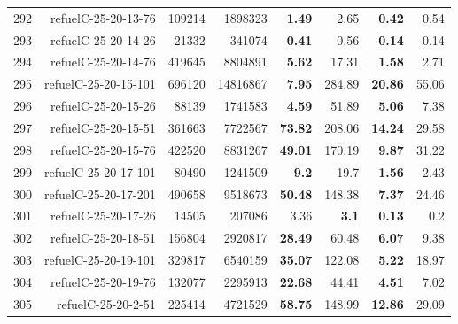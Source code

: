 \begin{longtable}{lrr@{\hskip 12pt}r@{\hskip 12pt}r@{\hskip 12pt}r@{\hskip 12pt}r@{\hskip 12pt}r}
292 & \multirow{1}{*}{refuelC-25-20-13-76} & \multirow{1}{*}{109214} & \multirow{1}{*}{1898323} & \textbf{1.49} & 2.65 & \textbf{0.42} & 0.54 \\
293 & \multirow{1}{*}{refuelC-25-20-14-26} & \multirow{1}{*}{21332} & \multirow{1}{*}{341074} & \textbf{0.41} & 0.56 & \textbf{0.14} & 0.14 \\
294 & \multirow{1}{*}{refuelC-25-20-14-76} & \multirow{1}{*}{419645} & \multirow{1}{*}{8804891} & \textbf{5.62} & 17.31 & \textbf{1.58} & 2.71 \\
295 & \multirow{1}{*}{refuelC-25-20-15-101} & \multirow{1}{*}{696120} & \multirow{1}{*}{14816867} & \textbf{7.95} & 284.89 & \textbf{20.86} & 55.06 \\
296 & \multirow{1}{*}{refuelC-25-20-15-26} & \multirow{1}{*}{88139} & \multirow{1}{*}{1741583} & \textbf{4.59} & 51.89 & \textbf{5.06} & 7.38 \\
297 & \multirow{1}{*}{refuelC-25-20-15-51} & \multirow{1}{*}{361663} & \multirow{1}{*}{7722567} & \textbf{73.82} & 208.06 & \textbf{14.24} & 29.58 \\
298 & \multirow{1}{*}{refuelC-25-20-15-76} & \multirow{1}{*}{422520} & \multirow{1}{*}{8831267} & \textbf{49.01} & 170.19 & \textbf{9.87} & 31.22 \\
299 & \multirow{1}{*}{refuelC-25-20-17-101} & \multirow{1}{*}{80490} & \multirow{1}{*}{1241509} & \textbf{9.2} & 19.7 & \textbf{1.56} & 2.43 \\
300 & \multirow{1}{*}{refuelC-25-20-17-201} & \multirow{1}{*}{490658} & \multirow{1}{*}{9518673} & \textbf{50.48} & 148.38 & \textbf{7.37} & 24.46 \\
301 & \multirow{1}{*}{refuelC-25-20-17-26} & \multirow{1}{*}{14505} & \multirow{1}{*}{207086} & 3.36 & \textbf{3.1} & \textbf{0.13} & 0.2 \\
302 & \multirow{1}{*}{refuelC-25-20-18-51} & \multirow{1}{*}{156804} & \multirow{1}{*}{2920817} & \textbf{28.49} & 60.48 & \textbf{6.07} & 9.38 \\
303 & \multirow{1}{*}{refuelC-25-20-19-101} & \multirow{1}{*}{329817} & \multirow{1}{*}{6540159} & \textbf{35.07} & 122.08 & \textbf{5.22} & 18.97 \\
304 & \multirow{1}{*}{refuelC-25-20-19-76} & \multirow{1}{*}{132077} & \multirow{1}{*}{2295913} & \textbf{22.68} & 44.41 & \textbf{4.51} & 7.02 \\
305 & \multirow{1}{*}{refuelC-25-20-2-51} & \multirow{1}{*}{225414} & \multirow{1}{*}{4721529} & \textbf{58.75} & 148.99 & \textbf{12.86} & 29.09 \\

\end{longtable}
